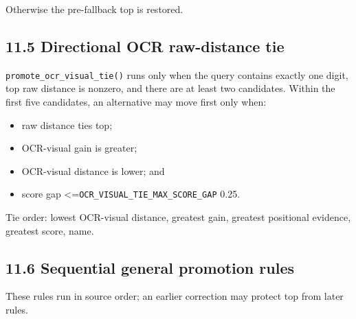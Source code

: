 Otherwise the pre-fallback top is restored.

\subsection{11.5 Directional OCR raw-distance tie}\label{115-directional-ocr-raw-distance-tie}

\texttt{promote\_\allowbreak{}ocr\_\allowbreak{}visual\_\allowbreak{}tie()} runs only when the query contains exactly one digit, top raw distance is nonzero, and there are at least two candidates. Within the first five candidates, an alternative may move first only when:

\begin{itemize}
\tightlist
\item
  raw distance ties top;
\item
  OCR-visual gain is greater;
\item
  OCR-visual distance is lower; and
\item
  score gap \textless=\texttt{OCR\_\allowbreak{}VISUAL\_\allowbreak{}TIE\_\allowbreak{}MAX\_\allowbreak{}SCORE\_\allowbreak{}GAP} 0.25.
\end{itemize}

Tie order: lowest OCR-visual distance, greatest gain, greatest positional evidence, greatest score, name.

\subsection{11.6 Sequential general promotion rules}\label{116-sequential-general-promotion-rules}

These rules run in source order; an earlier correction may protect top from later rules.

